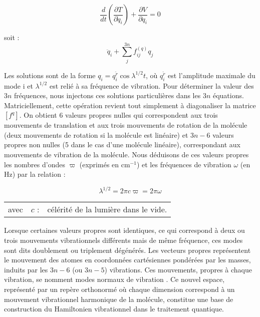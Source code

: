 \begin{equation}
\frac{d}{dt}\left(\frac{\partial T}{\partial \dot{q}_i}\right) + \frac{\partial V}{\partial q_i} = 0
\end{equation}

\noindent soit : 
\begin{equation}
\ddot{q}_i + \sum^{3n}_j f^{(q)}_{ij} q_j
\end{equation}

Les solutions sont de la forme $q_i = q_i^{\check{r}} \cos \lambda^{1/2} t$, où $q_i^{\check{r}}$ est l'amplitude maximale du mode i et $\lambda^{1/2}$ est relié à sa fréquence de vibration. Pour déterminer la valeur des $3n$ fréquences, nous injectons ces solutions particulières dans les $3n$ équations. Matriciellement, cette opération revient tout simplement à diagonaliser la matrice $\left[ f^q\right]$.
On obtient 6 valeurs propres nulles qui correspondent aux trois mouvements de translation et aux trois mouvements de rotation de la molécule (deux mouvements de rotation si la molécule est linéaire) et $3n-6$ valeurs propres non nulles (5 dans le cas d'une molécule linéaire), correspondant aux mouvements de vibration de la molécule. Nous déduisons de ces valeurs propres les nombres d'ondes $\varpi$ (exprimés en cm$^{-1}$) et les fréquences de vibration $\omega$ (en Hz) par la relation :

\begin{equation}
\lambda^{1/2} = 2\pi c\varpi = 2\pi\omega
\label{varpi}
\end{equation}
\begin{flushleft}
	\begin{tabular}{@{}lrp{10cm}}
		avec & $c$ : & célérité de la lumière dans le vide. 
	\end{tabular}
\end{flushleft}

Lorsque certaines valeurs propres sont identiques, ce qui correspond à deux ou trois mouvements vibrationnels différents mais de même fréquence, ces modes sont dits doublement ou triplement dégénérés.
Les vecteurs propres représentent le mouvement des atomes en coordonnées cartésiennes pondérées par les masses, induits par les $3n-6$ (ou $3n-5$) vibrations. Ces mouvements, propres à chaque vibration, se nomment \og modes normaux de vibration \fg. Ce nouvel espace, représenté par un repère orthonormé où chaque dimension correspond à un mouvement vibrationnel harmonique de la molécule, constitue une base de construction du Hamiltonien vibrationnel dans le traitement quantique.



